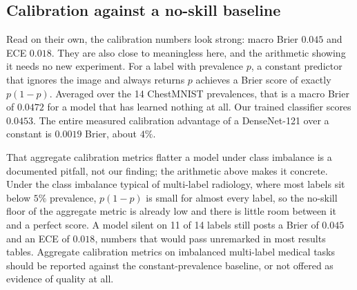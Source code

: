 \documentclass[10pt,twocolumn]{article}
\begin{document}
\subsection{Calibration against a no-skill baseline}
\label{sec:calib}
Read on their own, the calibration numbers look strong: macro Brier $0.045$ and
ECE $0.018$. They are also close to meaningless here, and the arithmetic showing
it needs no new experiment. For a label with prevalence $p$, a constant predictor
that ignores the image and always returns $p$ achieves a Brier score of exactly
$p(1-p)$. Averaged over the 14 ChestMNIST prevalences, that is a macro Brier of
$\mathbf{0.0472}$ for a model that has learned nothing at all. Our trained
classifier scores $\mathbf{0.0453}$. The entire measured calibration advantage of
a DenseNet-121 over a constant is $0.0019$ Brier, about $4\%$.

That aggregate calibration metrics flatter a model under class imbalance is a
documented pitfall, not our finding; the arithmetic above makes it concrete.
Under the class
imbalance typical of multi-label radiology, where
most labels sit below $5\%$ prevalence, $p(1-p)$ is small for almost every label,
so the no-skill floor of the aggregate metric is already low and there is little
room between it and a perfect score. A model silent on 11 of 14 labels still posts
a Brier of $0.045$ and an ECE of $0.018$, numbers that would pass unremarked in
most results tables. Aggregate calibration metrics on imbalanced multi-label
medical tasks should be reported against the constant-prevalence baseline, or not
offered as evidence of quality at all.
\end{document}
